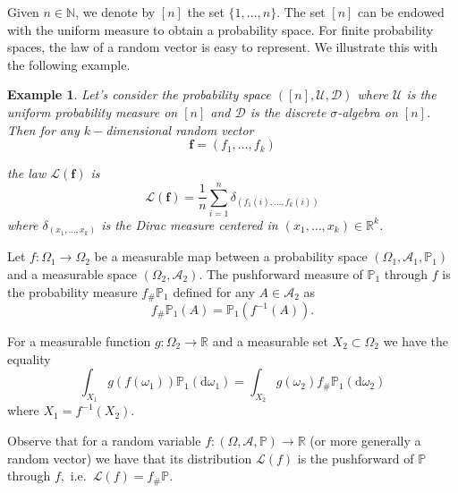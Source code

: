 \documentclass[11pt]{article}
\newtheorem{example}[theorem]{Example}
\def\R{\mathbb{R}}
\def\N{\mathbb{N}}
\def\P{\mathbb{P}}
\newcommand{\cA}{{\mathcal A}}  %
\renewcommand{\P}{\mathbb{P}}
\begin{document}
Given $n\in\N$, we denote by $[n]$ the set $\{1,\ldots,n\}$. The set $[n]$ can be endowed with the uniform measure to obtain a probability space. For finite probability spaces, the law of a random vector is easy to represent. We illustrate this with the following example.
\begin{example}
Let's consider the probability space $([n],\mathcal{U},\mathcal{D})$ where $\mathcal{U}$ is the uniform probability measure on $[n]$ and $\mathcal{D}$ is the discrete $\sigma$-algebra on $[n]$. Then for any $k-$dimensional random vector $$
\mathbf{f}=(f_1,\ldots,f_k)$$

the law $\mathcal{L}(\mathbf{f})$ is 
$$
\mathcal{L}(\mathbf{f})=\frac{1}{n}\sum^n_{i=1}\delta_{(f_1(i),\ldots,f_k(i))}
$$
where $\delta_{(x_1,\ldots,x_k)}$ is the Dirac measure centered in $(x_1,\ldots,x_k)\in \R^k$. \newline
\end{example}
Let $f : \Omega_1 \to \Omega_2$ be a measurable map between a probability space $(\Omega_1, \mathcal{A}_1, \P_1)$ and a measurable space $(\Omega_2,\cA_2).$ The pushforward measure of $\P_1$ through $f$ is the probability measure $f_{\#}\P_1$ defined for any $A\in \cA_2$ as $$
f_{\#}\P_1(A)=\P_1(f^{-1}(A)).$$

For a measurable function $g:\Omega_2  \rightarrow \R$ and a measurable set $X_2\subset \Omega_2$ we have the equality 
\begin{equation}\label{EqPushForwardInt}
\int_{X_1}g(f(\omega_1))\P_1(\mathrm{d}\omega_1)=\int_{X_2}g(\omega_2)f_{\#}\P_1(\mathrm{d}\omega_2)
\end{equation}
where $X_1=f^{-1}(X_2).$

Observe that for a random variable $f:(\Omega,\cA,\P) \rightarrow \R$ (or more generally a random vector) we have that its distribution $\mathcal{L}(f)$ is the pushforward of $\P$ through $f,$ i.e.\ $\mathcal{L}(f)=f_{\#}\P.$ 
\end{document}

